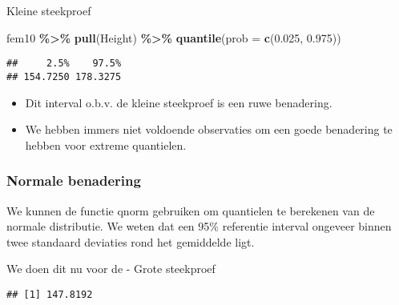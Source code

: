 \documentclass[
  12pt,dutch,coursenotes]{book}
\newenvironment{Shaded}{\begin{snugshade}}{\end{snugshade}}
\newcommand{\DataTypeTok}[1]{\textcolor[rgb]{0.13,0.29,0.53}{#1}}
\newcommand{\DecValTok}[1]{\textcolor[rgb]{0.00,0.00,0.81}{#1}}
\newcommand{\FloatTok}[1]{\textcolor[rgb]{0.00,0.00,0.81}{#1}}
\newcommand{\KeywordTok}[1]{\textcolor[rgb]{0.13,0.29,0.53}{\textbf{#1}}}
\newcommand{\NormalTok}[1]{#1}
\newcommand{\OperatorTok}[1]{\textcolor[rgb]{0.81,0.36,0.00}{\textbf{#1}}}
\newcommand{\StringTok}[1]{\textcolor[rgb]{0.31,0.60,0.02}{#1}}
\providecommand{\tightlist}{%
  \setlength{\itemsep}{0pt}\setlength{\parskip}{0pt}}
\theoremstyle{definition}
\theoremstyle{definition}
\theoremstyle{definition}
\theoremstyle{remark}
\begin{document}
Kleine steekproef

\begin{Shaded}
\begin{Highlighting}[]
\NormalTok{fem10 }\OperatorTok{\%\textgreater{}\%}\StringTok{ }\KeywordTok{pull}\NormalTok{(Height) }\OperatorTok{\%\textgreater{}\%}\StringTok{ }\KeywordTok{quantile}\NormalTok{(}\DataTypeTok{prob =} \KeywordTok{c}\NormalTok{(}\FloatTok{0.025}\NormalTok{, }
    \FloatTok{0.975}\NormalTok{))}
\end{Highlighting}
\end{Shaded}

\begin{verbatim}
##     2.5%    97.5% 
## 154.7250 178.3275
\end{verbatim}

\begin{itemize}
\tightlist
\item
  Dit interval o.b.v. de kleine steekproef is een ruwe benadering.
\item
  We hebben immers niet voldoende observaties om een goede benadering te hebben voor extreme quantielen.
\end{itemize}

\hypertarget{normale-benadering-1}{%
\subsubsection{Normale benadering}\label{normale-benadering-1}}

We kunnen de functie qnorm gebruiken om quantielen te berekenen van de normale distributie. We weten dat een 95\% referentie interval ongeveer binnen twee standaard deviaties rond het gemiddelde ligt.

We doen dit nu voor de
- Grote steekproef

\begin{Shaded}
\end{Shaded}

\begin{verbatim}
## [1] 147.8192
\end{verbatim}

\begin{Shaded}
\end{Shaded}
\end{document}
